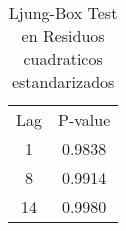 \begin{table}[!h]
 
\begin{center}
    

\begin{tabular}[!h]{ |c |  c |  } \hline
	
	\rowcolor{cyan} \multicolumn{2}{ |c| }{ \textbf{Ljung-Box Test en Residuos cuadráticos estandarizados }} \\ \hline
	 \hline
	

\rowcolor{red}   Lag & P-value \\\hline
	  
	                1	& 0.9838 \\\hline
                    8	& 0.9914  \\\hline
                    14	& 0.9980  \\\hline
                    
	
	\end{tabular}

\caption{Ljung-Box Test en Residuos cuadraticos estandarizados}
	\label{Ljung-Box Test en Residuos cuadraticos estandarizados}
	
\end{center}

\end{table}